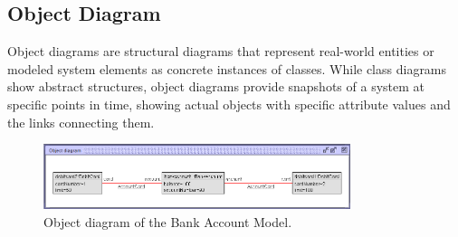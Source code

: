 
\subsection{Object Diagram}
Object diagrams are structural diagrams that represent real-world entities or 
modeled system elements as concrete instances of classes. While class diagrams 
show abstract structures, object diagrams provide snapshots of a system at specific 
points in time, showing actual objects with specific attribute values and the links 
connecting them.

\begin{figure}
    \begin{center}
        \includegraphics[width=0.8\textwidth]{figures/c1/BankAccount/BA_ObjectDiagram.png}
        \caption{Object diagram of the Bank Account Model.}
        \label{fig:object_diagram_bank_account_model}
    \end{center}
\end{figure}

